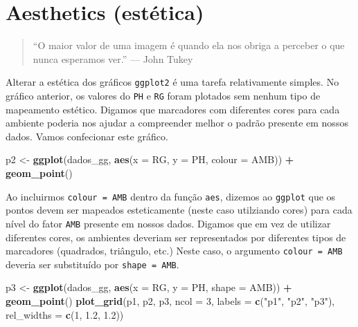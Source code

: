 \documentclass[
]{book}
\newenvironment{Shaded}{\begin{snugshade}}{\end{snugshade}}
\newcommand{\DataTypeTok}[1]{\textcolor[rgb]{0.13,0.29,0.53}{#1}}
\newcommand{\DecValTok}[1]{\textcolor[rgb]{0.00,0.00,0.81}{#1}}
\newcommand{\FloatTok}[1]{\textcolor[rgb]{0.00,0.00,0.81}{#1}}
\newcommand{\KeywordTok}[1]{\textcolor[rgb]{0.13,0.29,0.53}{\textbf{#1}}}
\newcommand{\NormalTok}[1]{#1}
\newcommand{\OperatorTok}[1]{\textcolor[rgb]{0.81,0.36,0.00}{\textbf{#1}}}
\newcommand{\StringTok}[1]{\textcolor[rgb]{0.31,0.60,0.02}{#1}}
\begin{document}
\hypertarget{aesthetics-estuxe9tica}{%
\section{Aesthetics (estética)}\label{aesthetics-estuxe9tica}}

\begin{quote}
``O maior valor de uma imagem é quando ela nos obriga a perceber
o que nunca esperamos ver.'' --- John Tukey
\end{quote}

Alterar a estética dos gráficos \texttt{ggplot2} é uma tarefa relativamente simples. No gráfico anterior, os valores do \texttt{PH} e \texttt{RG} foram plotados sem nenhum tipo de mapeamento estético. Digamos que marcadores com diferentes cores para cada ambiente poderia nos ajudar a compreender melhor o padrão presente em nossos dados. Vamos confecionar este gráfico.

\begin{Shaded}
\begin{Highlighting}[]
\NormalTok{p2 <-}\StringTok{ }\KeywordTok{ggplot}\NormalTok{(dados_gg, }\KeywordTok{aes}\NormalTok{(}\DataTypeTok{x =}\NormalTok{ RG, }\DataTypeTok{y =}\NormalTok{ PH, }\DataTypeTok{colour =}\NormalTok{ AMB)) }\OperatorTok{+}
\StringTok{      }\KeywordTok{geom_point}\NormalTok{()}
\end{Highlighting}
\end{Shaded}

Ao incluirmos \texttt{colour\ =\ AMB} dentro da função \texttt{aes}, dizemos ao \texttt{ggplot} que os pontos devem ser mapeados esteticamente (neste caso utilziando cores) para cada nível do fator \texttt{AMB} presente em nossos dados. Digamos que em vez de utilizar diferentes cores, os ambientes deveriam ser representados por diferentes tipos de marcadores (quadrados, triângulo, etc.) Neste caso, o argumento \texttt{colour\ =\ AMB} deveria ser substituído por \texttt{shape\ =\ AMB}.

\begin{Shaded}
\begin{Highlighting}[]
\NormalTok{p3 <-}\StringTok{ }\KeywordTok{ggplot}\NormalTok{(dados_gg, }\KeywordTok{aes}\NormalTok{(}\DataTypeTok{x =}\NormalTok{ RG, }\DataTypeTok{y =}\NormalTok{ PH, }\DataTypeTok{shape =}\NormalTok{ AMB)) }\OperatorTok{+}
\StringTok{      }\KeywordTok{geom_point}\NormalTok{()}
\KeywordTok{plot_grid}\NormalTok{(p1, p2, p3,}
          \DataTypeTok{ncol =} \DecValTok{3}\NormalTok{,}
          \DataTypeTok{labels =} \KeywordTok{c}\NormalTok{(}\StringTok{"p1"}\NormalTok{, }\StringTok{"p2"}\NormalTok{, }\StringTok{"p3"}\NormalTok{),}
          \DataTypeTok{rel_widths =} \KeywordTok{c}\NormalTok{(}\DecValTok{1}\NormalTok{, }\FloatTok{1.2}\NormalTok{, }\FloatTok{1.2}\NormalTok{))}
\end{Highlighting}
\end{Shaded}
\end{document}

